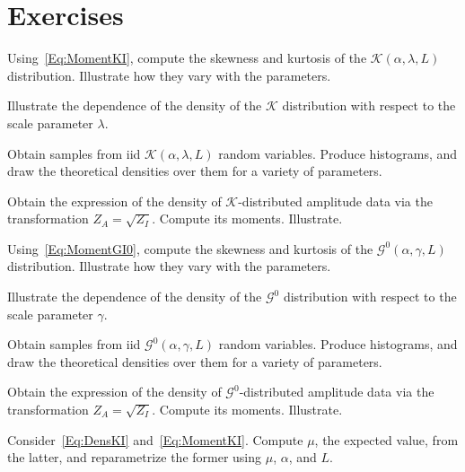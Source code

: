 \section*{Exercises}

\begin{exer}
Using~\eqref{Eq:MomentKI}, compute the skewness and kurtosis of the $\mathcal K(\alpha,\lambda,L)$ distribution.
Illustrate how they vary with the parameters.
\end{exer}

\begin{exer}
Illustrate the dependence of the density of the $\mathcal K$ distribution with respect to the scale parameter $\lambda$.
\end{exer}

\begin{exer}
Obtain samples from iid $\mathcal{K}(\alpha,\lambda,L)$ random variables.
Produce histograms, and draw the theoretical densities over them for a variety of parameters.
\end{exer}

\begin{exer}
Obtain the expression of the density of $\mathcal K$-distributed amplitude data via the transformation $Z_A=\sqrt{Z_I}$.
Compute its moments.
Illustrate.
\end{exer}

\begin{exer}
Using~\eqref{Eq:MomentGI0}, compute the skewness and kurtosis of the $\mathcal G^0(\alpha,\gamma,L)$ distribution.
Illustrate how they vary with the parameters.
\end{exer}

\begin{exer}
Illustrate the dependence of the density of the $\mathcal G^0$ distribution with respect to the scale parameter $\gamma$.
\end{exer}

\begin{exer}
Obtain samples from iid $\mathcal{G}^0(\alpha,\gamma,L)$ random variables.
Produce histograms, and draw the theoretical densities over them for a variety of parameters.
\end{exer}

\begin{exer}
Obtain the expression of the density of $\mathcal G^0$-distributed amplitude data via the transformation $Z_A=\sqrt{Z_I}$.
Compute its moments.
Illustrate.
\end{exer}

\begin{exer}
Consider~\eqref{Eq:DensKI} and~\eqref{Eq:MomentKI}.
Compute $\mu$, the expected value, from the latter, and reparametrize the former using $\mu$, $\alpha$, and $L$.
\end{exer}

